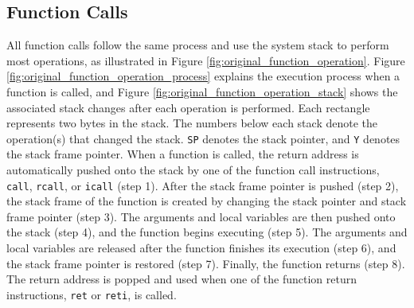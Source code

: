 \subsection{Function Calls}
\vspace{-10pt}
All function calls follow the same process and use the system stack to perform most operations, as illustrated in Figure \ref{fig:original_function_operation}. Figure \ref{fig:original_function_operation_process} explains the execution process when a function is called, and Figure \ref{fig:original_function_operation_stack} shows the associated stack changes after each operation is performed. Each rectangle represents two bytes in the stack. The numbers below each stack denote the operation(s) that changed the stack. \texttt{SP} denotes the stack pointer, and \texttt{Y} denotes the stack frame pointer. When a function is called, the return address is automatically pushed onto the stack by one of the function call instructions, \texttt{call}, \texttt{rcall}, or \texttt{icall} (step 1). After the stack frame pointer is pushed (step 2), the stack frame of the function is created by changing the stack pointer and stack frame pointer (step 3). The arguments and local variables are then pushed onto the stack (step 4), and the function begins executing (step 5). The arguments and local variables are released after the function finishes its execution (step 6), and the stack frame pointer is restored (step 7). Finally, the function returns (step 8). The return address is popped and used when one of the function return instructions, \texttt{ret} or \texttt{reti}, is called.
